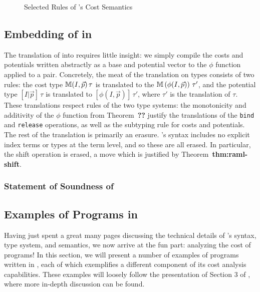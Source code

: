 \begin{figure}
\label{fig:selected-sem-rules}
\caption{Selected Rules of \dlambdaamor's Cost Semantics}
\end{figure}

\subsection{Embedding of \dlambdaamor in \lambdaamorminus}
The translation of \dlambdaamor into \lambdaamorminus requires little insight: we simply compile the costs and potentials written abstractly as a base and potential vector to the $\phi$ function applied to a pair. Concretely, the meat of the translation on types consists of two rules: the \dlambdaamor cost type $\mathbb{M}(I,\vec{p}) \, \tau$ is translated to the \lambdaamorminus $\mathbb{M} \left(\phi(I,\vec{p})\right)\, \tau'$, and the potential type $[I|\vec{p}] \, \tau$ is translated to $\left[\phi(I,\vec{p})\right] \, \tau'$, where $\tau'$ is the translation of $\tau$. These translations respect rules of the two type systems: the monotonicity and additivity of the $\phi$ function from Theorem~\textbf{??} justify the translations of the \texttt{bind} and \texttt{release} operations, as well as the subtyping rule for costs and potentials. The rest of the translation is primarily an erasure. \lambdaamorminus's syntax includes no explicit index terms or types at the term level, and so these are all erased. In particular, the shift operation is erased, a move which is justified by Theorem~\textbf{thm:raml-shift}.


\subsubsection{Statement of Soundness of \dlambdaamor}



\subsection{Examples of Programs in \dlambdaamor}
Having just spent a great many pages discussing the technical details of \dlambdaamor's syntax, type system, and semantics, we now arrive at the fun part: analyzing the cost of programs! In this section, we will present a number of examples of programs written in \dlambdaamor, each of which exemplifies a different component of its cost analysis capabilities. These examples will loosely follow the presentation of Section 3 of \citet{rajani-et-al:popl21}, where more in-depth discussion can be found.

